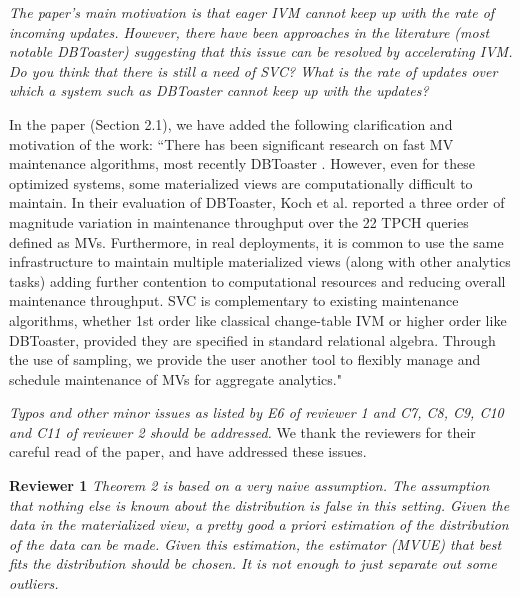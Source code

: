 \vspace{1em}
\emph{The paper's main motivation is that eager IVM cannot keep up with the rate of incoming updates. However, there have been approaches in the literature (most notable DBToaster) suggesting that this issue can be resolved by accelerating IVM. Do you think that there is still a need of SVC? What is the rate of updates over which a system such as DBToaster cannot keep up with the updates?}

In the paper (Section 2.1), we have added the following clarification and motivation of the work:
``There has been significant research on fast MV maintenance algorithms, most recently DBToaster \cite{DBLP:journals/vldb/KochAKNNLS14}. However, even for these optimized systems, some materialized views are computationally difficult to maintain. In their evaluation of DBToaster, Koch et al. \cite{DBLP:journals/vldb/KochAKNNLS14} reported a three order of magnitude variation in maintenance throughput over the 22 TPCH queries defined as MVs. Furthermore, in real deployments, it is common to use the same infrastructure to maintain multiple materialized views (along with other analytics tasks) adding further contention to computational resources and reducing overall maintenance throughput. SVC is complementary to existing maintenance algorithms, whether 1st order like classical change-table IVM or higher order like DBToaster, provided they are specified in standard relational algebra. Through the use of sampling, we provide the user another tool to flexibly manage and schedule maintenance of MVs for aggregate analytics."

\vspace{1em}
\emph{Typos and other minor issues as listed by E6 of reviewer 1 and C7, C8, C9, C10 and C11 of reviewer 2 should be addressed.}
We thank the reviewers for their careful read of the paper, and have addressed these issues.

\vspace{1em}
\noindent\textbf{Reviewer 1}
\emph{Theorem 2 is based on a very naive assumption. The assumption that nothing else is known about the distribution is false in this setting. Given the data in the materialized view, a pretty good a priori estimation of the distribution of the data can be made. Given this estimation, the estimator (MVUE) that best fits the distribution should be chosen. It is not enough to just separate out some outliers.}

